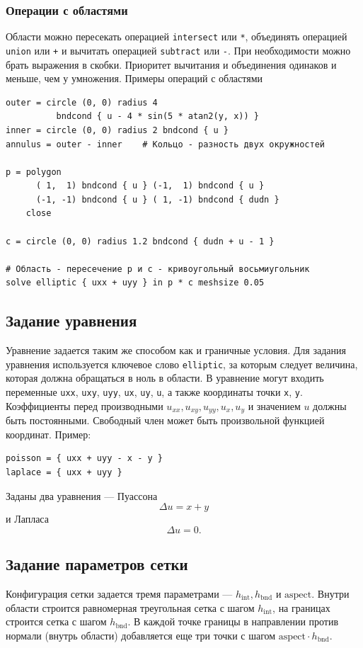 \documentclass[12pt]{article}
\begin{document}
\subsubsection{Операции с областями}
Области можно пересекать операцией \verb|intersect| или \verb|*|, объединять операцией \verb|union| или \verb|+| и вычитать операцией \verb|subtract| или \verb|-|. При необходимости можно брать выражения в скобки. Приоритет вычитания и объединения одинаков и меньше, чем у умножения. Примеры операций с областями
\begin{verbatim}
outer = circle (0, 0) radius 4
          bndcond { u - 4 * sin(5 * atan2(y, x)) }
inner = circle (0, 0) radius 2 bndcond { u }
annulus = outer - inner    # Кольцо - разность двух окружностей

p = polygon
      ( 1,  1) bndcond { u } (-1,  1) bndcond { u }
      (-1, -1) bndcond { u } ( 1, -1) bndcond { dudn }
    close

c = circle (0, 0) radius 1.2 bndcond { dudn + u - 1 }

# Область - пересечение p и c - кривоугольный восьмиугольник
solve elliptic { uxx + uyy } in p * c meshsize 0.05
\end{verbatim}

\subsection{Задание уравнения}
Уравнение задается таким же способом как и граничные условия. Для задания уравнения используется ключевое слово \verb|elliptic|, за которым следует величина, которая должна обращаться в ноль в области. В уравнение могут входить переменные \verb|uxx|, \verb|uxy|, \verb|uyy|, \verb|ux|, \verb|uy|, \verb|u|, а также координаты точки \verb|x|, \verb|y|. Коэффициенты перед производными $u_{xx}, u_{xy}, u_{yy}, u_{x}, u_{y}$ и значением $u$ должны быть постоянными. Свободный член может быть произвольной функцией координат. Пример:
\begin{verbatim}
poisson = { uxx + uyy - x - y }
laplace = { uxx + uyy }
\end{verbatim}
Заданы два уравнения --- Пуассона
$$
\Delta u = x + y
$$
и Лапласа
$$
\Delta u = 0.
$$

\subsection{Задание параметров сетки}
Конфигурация сетки задается тремя параметрами --- $h_\text{int}, h_\text{bnd}$ и $\text{aspect}$.
Внутри области строится равномерная треугольная сетка с шагом $h_\text{int}$, на границах строится сетка с шагом $h_\text{bnd}$. В каждой точке границы в направлении против нормали (внутрь области) добавляется еще три точки с шагом $\text{aspect} \cdot h_\text{bnd}$.
\end{document}
